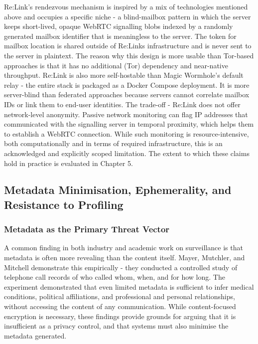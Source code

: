 \documentclass[12pt,a4paper]{article}
\begin{document}
Re:Link’s rendezvous mechanism is inspired by a mix of technologies mentioned above and occupies a specific niche - a blind-mailbox pattern in which the server keeps short-lived, opaque WebRTC signalling blobs indexed by a randomly generated mailbox identifier that is meaningless to the server. The token for mailbox location is shared outside of Re:Links infrastructure and is never sent to the server in plaintext. The reason why this design is more usable than Tor-based approaches is that it has no additional (Tor) dependency and near-native throughput. Re:Link is also more self-hostable than Magic Wormhole’s default relay - the entire stack is packaged as a Docker Compose deployment. It is more server-blind than federated approaches because servers cannot correlate mailbox IDs or link them to end-user identities. The trade-off - Re:Link does not offer network-level anonymity. Passive network monitoring can flag IP addresses that communicated with the signalling server in temporal proximity, which helps them to establish a WebRTC connection. While such monitoring is resource-intensive, both computationally and in terms of required infrastructure, this is an acknowledged and explicitly scoped limitation. The extent to which these claims hold in practice is evaluated in Chapter 5.

\subsection{Metadata Minimisation, Ephemerality, and Resistance to Profiling}

\subsubsection{Metadata as the Primary Threat Vector}

A common finding in both industry and academic work on surveillance is that metadata is often more revealing than the content itself. Mayer, Mutchler, and Mitchell \cite{mayer2016} demonstrate this empirically - they conducted a controlled study of telephone call records of who called whom, when, and for how long. The experiment demonstrated that even limited metadata is sufficient to infer medical conditions, political affiliations, and professional and personal relationships, without accessing the content of any communication. While content-focused encryption is necessary, these findings provide grounds for arguing that it is insufficient as a privacy control, and that systems must also minimise the metadata generated.
\end{document}
